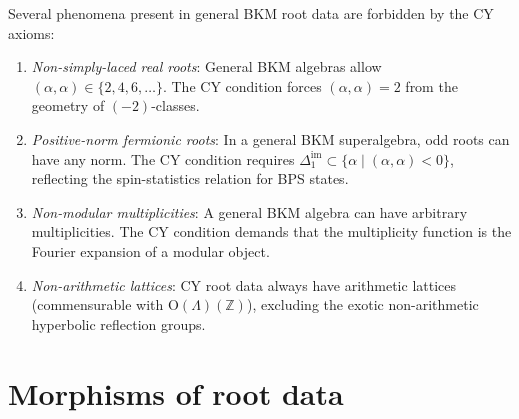 \begin{remark}
\label{rem:cy-exclusions}
Several phenomena present in general BKM root data are forbidden by the CY axioms:
\begin{enumerate}[label=(\alph*)]
 \item \emph{Non-simply-laced real roots}: General BKM algebras allow $(\alpha, \alpha) \in \{2, 4, 6, \ldots\}$. The CY condition forces $(\alpha, \alpha) = 2$ from the geometry of $(-2)$-classes.
 \item \emph{Positive-norm fermionic roots}: In a general BKM superalgebra, odd roots can have any norm. The CY condition requires $\Delta^{\mathrm{im}}_1 \subset \{\alpha \mid (\alpha,\alpha) < 0\}$, reflecting the spin-statistics relation for BPS states.
 \item \emph{Non-modular multiplicities}: A general BKM algebra can have arbitrary multiplicities. The CY condition demands that the multiplicity function is the Fourier expansion of a modular object.
 \item \emph{Non-arithmetic lattices}: CY root data always have arithmetic lattices (commensurable with $\mathrm{O}(\Lambda)(\mathbb{Z})$), excluding the exotic non-arithmetic hyperbolic reflection groups.
\end{enumerate}
\end{remark}


\section{Morphisms of root data}
\label{sec:morphisms-root-data}

